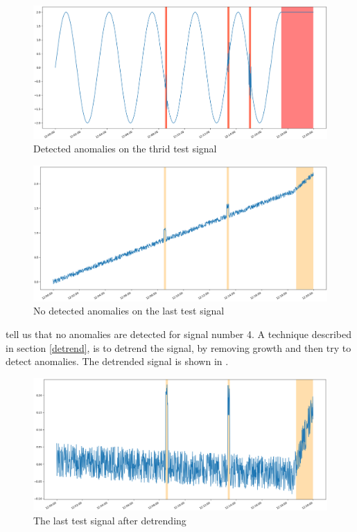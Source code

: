 \documentclass[english, a4paper]{report}
\begin{document}
{{{            \begin{figure}[H]
                \centering
                \includegraphics[width=\textwidth]{AnomType3Res}
                \caption{Detected anomalies on the thrid test signal}
                \label{fig:AnomType3Res}
            \end{figure}
            
            \begin{figure}[H]
                \centering
                \includegraphics[width=\textwidth]{AnomType4Res}
                \caption{No detected anomalies on the last test signal}
                \label{fig:AnomType4Res}
            \end{figure}
    
             tell us that no anomalies are detected for signal number 4. A technique described in section \ref{detrend}, is to detrend the signal, by removing growth and then try to detect anomalies. The detrended signal is shown in .
            
            \begin{figure}[H]
                \centering
                \includegraphics[width=\textwidth]{AnomType5}
                \caption{The last test signal after detrending}
                \label{fig:AnomType5}
            \end{figure}
            
}}}
\end{document}
